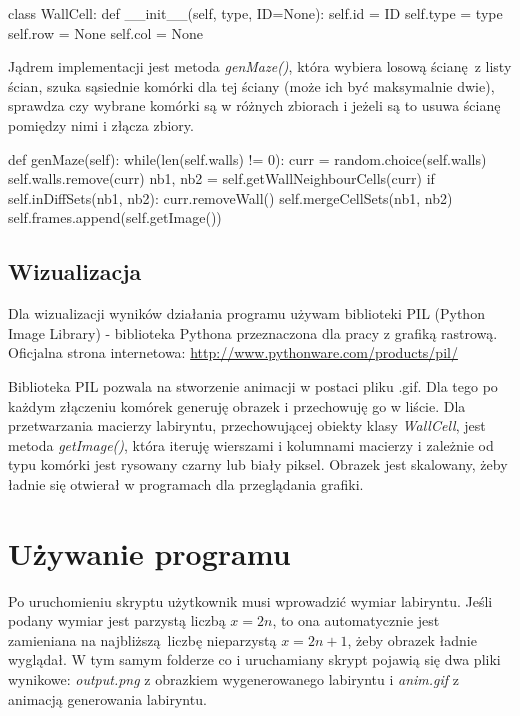 \documentclass[12pt]{report}
\begin{document}
\begin{python}
class WallCell:
	def __init__(self, type, ID=None):
		self.id = ID
		self.type = type
		self.row = None
		self.col = None

\end{python}

\par Jądrem implementacji jest metoda \textit{genMaze()}, która wybiera
losową ścianę z listy ścian, szuka sąsiednie komórki dla tej ściany
(może ich być maksymalnie dwie), sprawdza czy wybrane komórki są w
różnych zbiorach i jeżeli są to usuwa ścianę pomiędzy nimi i złącza 
zbiory.

\begin{python}
	def genMaze(self):
		while(len(self.walls) != 0):
			curr = random.choice(self.walls)
			self.walls.remove(curr)
			nb1, nb2 = self.getWallNeighbourCells(curr)
			if self.inDiffSets(nb1, nb2):
				curr.removeWall()
				self.mergeCellSets(nb1, nb2)
				self.frames.append(self.getImage())
\end{python}

\subsection{Wizualizacja}
\par Dla wizualizacji wyników działania programu używam biblioteki PIL
(Python Image Library) - biblioteka Pythona przeznaczona dla pracy z 
grafiką rastrową. Oficjalna strona internetowa: 
\url{http://www.pythonware.com/products/pil/}
\par Biblioteka PIL pozwala na stworzenie animacji w postaci pliku .gif.
Dla tego po każdym złączeniu komórek generuję obrazek i przechowuję go
w liście. Dla przetwarzania macierzy labiryntu, przechowującej obiekty 
klasy \textit{WallCell}, jest metoda \textit{getImage()}, która iteruję
wierszami i kolumnami macierzy i zależnie od typu komórki jest 
rysowany czarny lub biały piksel. Obrazek jest skalowany, żeby
 ładnie się otwierał w programach dla przeglądania grafiki.
 \newpage

\section{Używanie programu}
\par Po uruchomieniu skryptu użytkownik musi wprowadzić wymiar 
labiryntu. Jeśli podany wymiar jest parzystą liczbą $x=2n$,
to ona automatycznie jest zamieniana na najbliższą liczbę 
nieparzystą $x=2n+1$, żeby obrazek ładnie wyglądał. W tym samym 
folderze co i uruchamiany skrypt pojawią się dwa pliki wynikowe:
 \textit{output.png} z obrazkiem wygenerowanego
labiryntu i \textit{anim.gif} z animacją generowania labiryntu.
\end{document}
